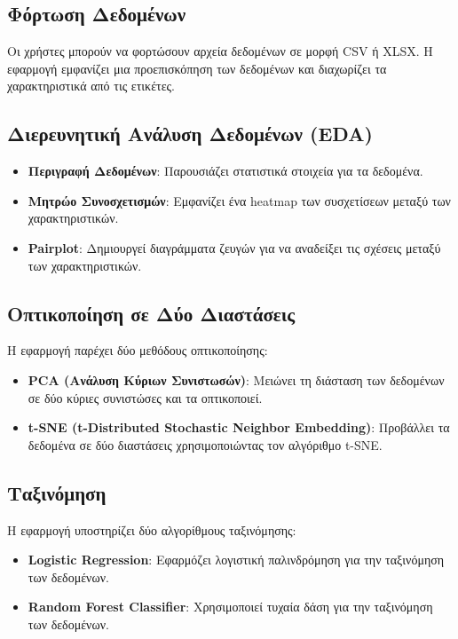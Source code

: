 \documentclass{article}
\begin{document}
\subsection{Φόρτωση Δεδομένων}
Οι χρήστες μπορούν να φορτώσουν αρχεία δεδομένων σε μορφή CSV ή XLSX. Η εφαρμογή εμφανίζει μια προεπισκόπηση των δεδομένων και διαχωρίζει τα χαρακτηριστικά από τις ετικέτες.

\subsection{Διερευνητική Ανάλυση Δεδομένων (EDA)}
\begin{itemize}
    \item \textbf{Περιγραφή Δεδομένων}: Παρουσιάζει στατιστικά στοιχεία για τα δεδομένα.
    \item \textbf{Μητρώο Συνοσχετισμών}: Εμφανίζει ένα heatmap των συσχετίσεων μεταξύ των χαρακτηριστικών.
    \item \textbf{Pairplot}: Δημιουργεί διαγράμματα ζευγών για να αναδείξει τις σχέσεις μεταξύ των χαρακτηριστικών.
\end{itemize}

\subsection{Οπτικοποίηση σε Δύο Διαστάσεις}
Η εφαρμογή παρέχει δύο μεθόδους οπτικοποίησης:
\begin{itemize}
    \item \textbf{PCA (Ανάλυση Κύριων Συνιστωσών)}: Μειώνει τη διάσταση των δεδομένων σε δύο κύριες συνιστώσες και τα οπτικοποιεί.
    \item \textbf{t-SNE (t-Distributed Stochastic Neighbor Embedding)}: Προβάλλει τα δεδομένα σε δύο διαστάσεις χρησιμοποιώντας τον αλγόριθμο t-SNE.
\end{itemize}

\subsection{Ταξινόμηση}
Η εφαρμογή υποστηρίζει δύο αλγορίθμους ταξινόμησης:
\begin{itemize}
    \item \textbf{Logistic Regression}: Εφαρμόζει λογιστική παλινδρόμηση για την ταξινόμηση των δεδομένων.
    \item \textbf{Random Forest Classifier}: Χρησιμοποιεί τυχαία δάση για την ταξινόμηση των δεδομένων.
\end{itemize}
\end{document}
